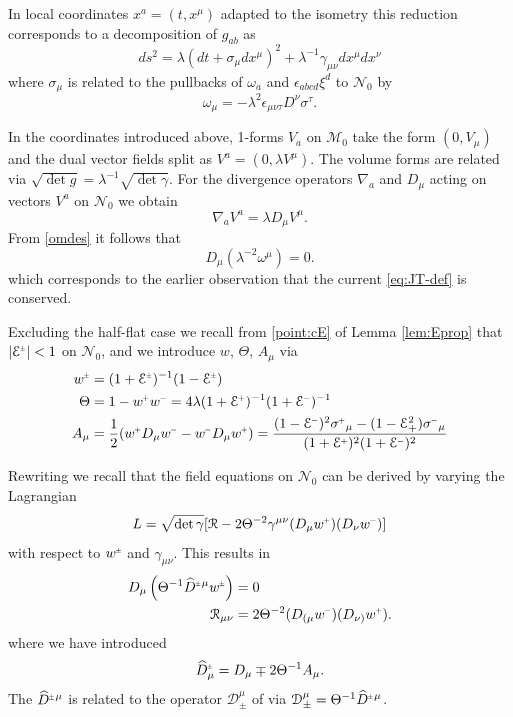 \documentclass[a4paper,10pt,reqno]{amsart}
\newcommand{\cE}{\mathcal{E}}
\newcommand{\cR}{\mathcal{R}}
\newcommand{\cM}{\mathcal{M}}
\newcommand{\cN}{\mathcal{N}}
\newcommand{\wh}{\widehat}
\newcommand{\Th}{\Theta}
\theoremstyle{plain}
\renewcommand{\P}[1]{{{#1}^{\hspace{-.5pt}\scaleto{+}{4pt}}}}
\newcommand{\M}[1]{{{#1}^{\hspace{-.5pt}\scaleto{-}{4pt}}}}
\newcommand{\PM}[1]{{{#1}^{\hspace{-.5pt}\scaleto{\pm}{3.5pt}}}}
\numberwithin{equation}{section}
\begin{document}
In local  coordinates $x^{a}=(t,x^{\mu})$ adapted to the isometry this reduction corresponds to a decomposition of $g_{ab}$ as
\begin{equation}
ds^{2} = \lambda(dt + \sigma_{\mu}dx^{\mu})^{2} + 
\lambda^{-1} \gamma_{\mu\nu} dx^{\mu} dx^{\nu} \label{2ds}
\end{equation}
where $\sigma_{\mu}$ is related to the pullbacks of $\omega_{a}$ and
$\epsilon_{abcd} \xi^{d}$ to $\cN_0$ by
\begin{equation}
\omega_{\mu} = - \lambda^{2} \epsilon_{\mu\nu\tau} D^{\nu} \sigma^{\tau}.
\label{omdes}
\end{equation}

In the coordinates introduced above, 1-forms $V_{a}$  on $\cM_0$ take the form $(0, V_{\mu})$ and the dual vector fields split as $V^{a} = (0, \lambda V^{\mu})$. The volume forms are related via $\sqrt{ \det g} = \lambda^{-1}  \sqrt{\det \gamma}$. For the divergence operators $\nabla_a$ and $D_{\mu}$ acting on vectors  $V^a$ on $\cN_0$ we obtain 
\begin{equation}
\nabla_{a} V^{a} = \lambda D_{\mu}  V^{\mu}.
\end{equation} 
From \eqref{omdes} it follows that
\begin{equation} \label{divom}
D_{\mu} (\lambda^{-2} \omega^{\mu}) = 0.
\end{equation}
which corresponds to the earlier observation that the current \eqref{eq:JT-def} is conserved.

Excluding the half-flat case we recall from \eqref{point:cE} of Lemma \ref{lem:Eprop} that  $|\PM{\cE}| < 1$ on $\cN_0$, and  we introduce $w$, $\Th$, $A_{\mu}$ via
\begin{align} \label{w}
\PM{w} ={}& (1+ \PM{\cE})^{-1}(1 -  \PM{\cE})  \\
\Theta ={}& 1 - \P{w}\M{w} =  4 \lambda (1 + \P{\cE})^{-1} (1 + \M{\cE})^{-1} \label{Th} \\
  A_{\mu} ={}& \frac{1}{2}(\P{w}D_{\mu}\M{w}-\M{w}D_{\mu}\P{w}) = \frac{(1 - \M{\cE})^2 \P{\sigma}_{\mu} - (1 - \cE_+^2) \M{\sigma}_{\mu}}
{(1 + \P{\cE})^2 (1 + \M{\cE})^2}
\label{A}
\end{align}

Rewriting \cite[Eq. (5.18)]{gibbons:hawking:1979}  we recall that the  field equations on $\cN_0$ can be derived by varying the Lagrangian
\begin{equation} \label{Lag}
L = \sqrt{\det \gamma}[\cR-2\Theta^{-2}\gamma^{\mu\nu}(D_{\mu}\P{w})(D_{\nu}\M{w})]
\end{equation}
with respect to $\PM{w}$ and $\gamma_{\mu\nu}$. This results in
\begin{align}
\label{lapw}
D_{\mu}\left( \Theta^{-1} \PM{\wh D}{}^{\mu} \PM{w} \right) ={}&  0 \\
\label{Ric}
\cR_{\mu\nu} ={}& 2\Theta^{-2}(D_{(\mu}\M{w})(D_{\nu)}\P{w}).
\end{align}
where we have introduced
\begin{equation}
\label{dhat}
\PM{\wh D}_{\mu} = D_{\mu} \mp 2\Theta^{-1}A_{\mu}.
\end{equation}
The $\PM{\wh D}{}^{\mu}$ is related to the operator $\mathcal{D}^{\mu}_{\pm}$ of \cite{simon:1995}
via $\mathcal {D}^{\mu}_{\pm}  = \Theta^{-1} \PM{\wh D}{}^{\mu}$.
  
\end{document}
